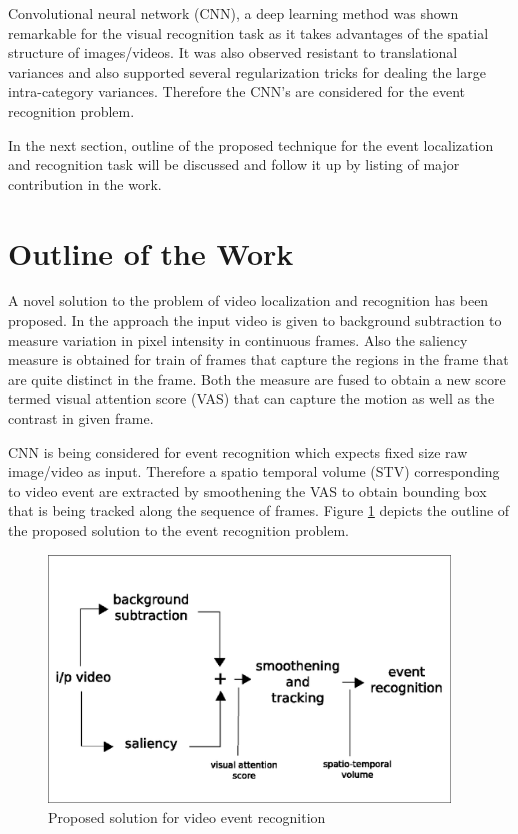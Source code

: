 \par Convolutional neural network (CNN), a deep learning method was shown remarkable for the visual recognition task as it takes advantages of the spatial structure of images/videos. It was
also observed resistant to translational variances and also supported several regularization tricks for dealing the large intra-category variances. Therefore the CNN's are considered for  the event recognition problem.
\par In the next section, outline of the proposed technique for the event localization and  recognition task will be discussed and follow it up by listing of major contribution in the work.
\clearpage
\section{Outline of the Work}
A novel solution to the problem of video localization and recognition has been proposed. In the approach the input video is given to background subtraction to measure variation in pixel intensity in continuous frames. Also the saliency measure is obtained for train of frames that capture the regions in the frame that are quite distinct in the frame. Both the measure are fused to obtain a new score termed visual attention score (VAS) that can capture the motion as well as the contrast in given frame. 
\par CNN is being considered for event recognition  which expects fixed size raw image/video as input. Therefore a spatio temporal volume (STV) corresponding to video event are extracted by smoothening the VAS to obtain bounding box that is being tracked along the sequence of frames. Figure \ref{fig:outline} depicts the outline of the proposed solution to the event recognition problem.
\begin{figure}[htpb]
   \begin{center}
	    \includegraphics[width=0.95\textwidth]{snaps/outline.eps}     
     \caption {Proposed solution for video event recognition}
   \label{fig:outline}
   \end{center}
 \end{figure}
 
